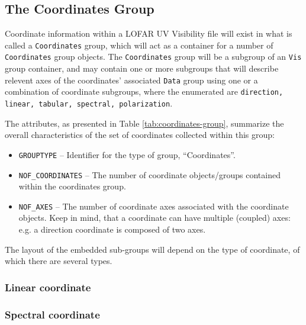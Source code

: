\documentclass[a4paper,10pt,bibtotoc]{scrartcl}
\begin{document}
\subsection{The Coordinates Group}
\label{sec:coordinates group}

Coordinate information within a LOFAR UV Visibility file will exist in what is called a \texttt{Coordinates} group, which will act as a container for a number of \texttt{Coordinates} group objects.  The \texttt{Coordinates} group will be a subgroup of an \texttt{Vis} group container, and may contain one or more subgroups that will describe relevent axes of the coordinates' associated \texttt{Data} group using one or a combination of coordinate subgroups, where the enumerated are \texttt{direction, linear, tabular, spectral, polarization}.



The attributes, as presented in Table \ref{tab:coordinates-group},  summarize the
overall characteristics of the set of coordinates collected within this group:
\begin{itemize}
\item \verb|GROUPTYPE| -- Identifier for the type of group, ``Coordinates''.
\item \verb|NOF_COORDINATES| -- The number of coordinate objects/groups contained within the coordinates group.
\item \verb|NOF_AXES| -- The number of coordinate axes associated with the 
  coordinate objects. Keep in mind, that a coordinate can have multiple (coupled)
  axes:  e.g. a direction coordinate is composed of two axes.
\end{itemize}

The layout of the embedded sub-groups will depend on the type of coordinate, of
which there are several types.

\subsubsection{Linear coordinate}
\label{sec:coord-linear}



\subsubsection{Spectral coordinate}
\label{sec:coord-spectral}


\end{document}
